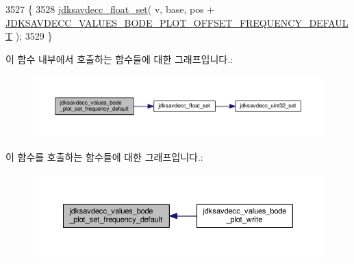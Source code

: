 \begin{DoxyCode}
3527 \{
3528     \hyperlink{group__endian_ga1f92dcb7b9e5f21f1df4b563ee9e04d5}{jdksavdecc\_float\_set}( v, base, pos + 
      \hyperlink{group__values__bode__plot_ga77bb61b01cddd727c68d2352ac3aa9a7}{JDKSAVDECC\_VALUES\_BODE\_PLOT\_OFFSET\_FREQUENCY\_DEFAULT} );
3529 \}
\end{DoxyCode}


이 함수 내부에서 호출하는 함수들에 대한 그래프입니다.\+:
\nopagebreak
\begin{figure}[H]
\begin{center}
\leavevmode
\includegraphics[width=350pt]{group__values__bode__plot_gab236bb981ea93a9799523eb2037dca34_cgraph}
\end{center}
\end{figure}




이 함수를 호출하는 함수들에 대한 그래프입니다.\+:
\nopagebreak
\begin{figure}[H]
\begin{center}
\leavevmode
\includegraphics[width=350pt]{group__values__bode__plot_gab236bb981ea93a9799523eb2037dca34_icgraph}
\end{center}
\end{figure}



